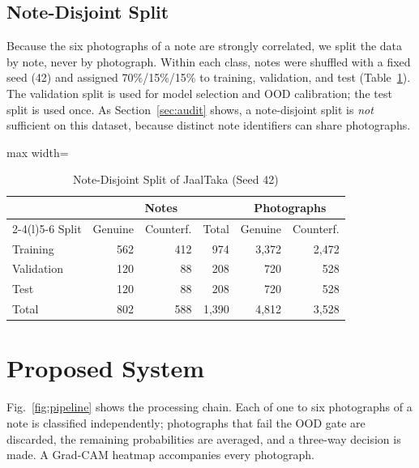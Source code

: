 \documentclass[journal]{IEEEtran}
\begin{document}
\subsection{Note-Disjoint Split}
Because the six photographs of a note are strongly correlated, we split the data by
note, never by photograph. Within each class, notes were shuffled with a fixed seed (42)
and assigned 70\%/15\%/15\% to training, validation, and test (Table~\ref{tab:split}).
The validation split is used for model selection and OOD calibration; the test split is
used once. As Section~\ref{sec:audit} shows, a note-disjoint split is \emph{not}
sufficient on this dataset, because distinct note identifiers can share photographs.

\begin{table}[!t]
\caption{Note-Disjoint Split of JaalTaka (Seed 42)}
\label{tab:split}
\centering
\footnotesize
\setlength{\tabcolsep}{4pt}
\begin{adjustbox}{max width=\columnwidth}
\begin{tabular}{@{}lrrrrr@{}}
\toprule
& \multicolumn{3}{c}{Notes} & \multicolumn{2}{c}{Photographs} \\
\cmidrule(lr){2-4}\cmidrule(l){5-6}
Split & Genuine & Counterf. & Total & Genuine & Counterf. \\
\midrule
Training   & 562 & 412 & 974 & 3{,}372 & 2{,}472 \\
Validation & 120 &  88 & 208 &   720   &   528   \\
Test       & 120 &  88 & 208 &   720   &   528   \\
\midrule
Total      & 802 & 588 & 1{,}390 & 4{,}812 & 3{,}528 \\
\bottomrule
\end{tabular}
\end{adjustbox}
\end{table}

\section{Proposed System}
\label{sec:method}

Fig.~\ref{fig:pipeline} shows the processing chain. Each of one to six photographs of a
note is classified independently; photographs that fail the OOD gate are discarded, the
remaining probabilities are averaged, and a three-way decision is made. A Grad-CAM
heatmap accompanies every photograph.
\end{document}
